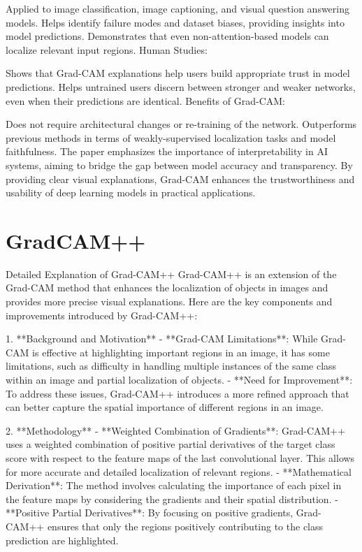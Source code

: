 Applied to image classification, image captioning, and visual question answering models.
Helps identify failure modes and dataset biases, providing insights into model predictions.
Demonstrates that even non-attention-based models can localize relevant input regions.
Human Studies:

Shows that Grad-CAM explanations help users build appropriate trust in model predictions.
Helps untrained users discern between stronger and weaker networks, even when their predictions are identical.
Benefits of Grad-CAM:

Does not require architectural changes or re-training of the network.
Outperforms previous methods in terms of weakly-supervised localization tasks and model faithfulness.
The paper emphasizes the importance of interpretability in AI systems, aiming to bridge the gap between model accuracy and transparency. By providing clear visual explanations, Grad-CAM enhances the trustworthiness and usability of deep learning models in practical applications.

\section{GradCAM++}
 Detailed Explanation of Grad-CAM++
Grad-CAM++ is an extension of the Grad-CAM method that enhances the localization of objects in images and provides more precise visual explanations. Here are the key components and improvements introduced by Grad-CAM++:

 1. **Background and Motivation**
- **Grad-CAM Limitations**: While Grad-CAM is effective at highlighting important regions in an image, it has some limitations, such as difficulty in handling multiple instances of the same class within an image and partial localization of objects.
- **Need for Improvement**: To address these issues, Grad-CAM++ introduces a more refined approach that can better capture the spatial importance of different regions in an image.

2. **Methodology**
- **Weighted Combination of Gradients**: Grad-CAM++ uses a weighted combination of positive partial derivatives of the target class score with respect to the feature maps of the last convolutional layer. This allows for more accurate and detailed localization of relevant regions.
  - **Mathematical Derivation**: The method involves calculating the importance of each pixel in the feature maps by considering the gradients and their spatial distribution.
  - **Positive Partial Derivatives**: By focusing on positive gradients, Grad-CAM++ ensures that only the regions positively contributing to the class prediction are highlighted.


